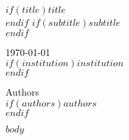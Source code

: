 \documentclass[12pt,a4paper]{scrartcl}
\begin{document}
\thispagestyle{empty}

\begin{center}
  \hfill \break%
  $if(title)$\Huge{$title$}\\[0.5em]$endif$
  $if(subtitle)$\Large{$subtitle$}\\[0.5em]$endif$

  \vspace{6cm}\today\\
  $if(institution)${$institution$}\\[2.5em]$endif$

  \vspace{6cm}\Large{Authors}\\
  $if(authors)${$authors$}\\[2.5em]$endif$
\end{center}
\newpage
\thispagestyle{empty}

\setcounter{secnumdepth}{3}
\setcounter{tocdepth}{3}
\tableofcontents
\newpage

$body$
\end{document}

